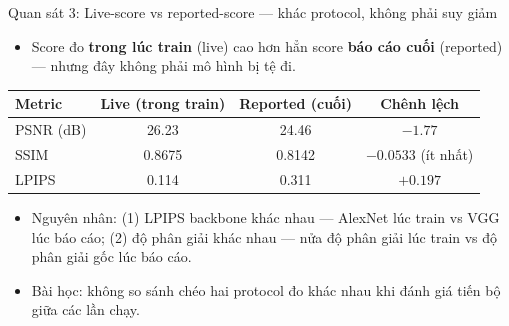 \begin{frame}{Quan sát 3: Live-score vs reported-score — khác protocol, không phải suy giảm}
\begin{itemize}
    \item Score đo \textbf{trong lúc train} (live) cao hơn hẳn score \textbf{báo cáo cuối} (reported) — nhưng đây không phải mô hình bị tệ đi.
\end{itemize}
\footnotesize
\begin{table}[]
\centering
\begin{tabular}{lccc}
\toprule
Metric & Live (trong train) & Reported (cuối) & Chênh lệch \\
\midrule
PSNR (dB) & 26.23 & 24.46 & $-1.77$ \\
SSIM & 0.8675 & 0.8142 & $-0.0533$ (ít nhất) \\
LPIPS & 0.114 & 0.311 & $+0.197$ \\
\bottomrule
\end{tabular}
\end{table}
\normalsize
\begin{itemize}
    \item Nguyên nhân: (1) LPIPS backbone khác nhau — AlexNet lúc train vs VGG lúc báo cáo; (2) độ phân giải khác nhau — nửa độ phân giải lúc train vs độ phân giải gốc lúc báo cáo.
    \item \alert{Bài học:} không so sánh chéo hai protocol đo khác nhau khi đánh giá tiến bộ giữa các lần chạy.
\end{itemize}
\end{frame}

